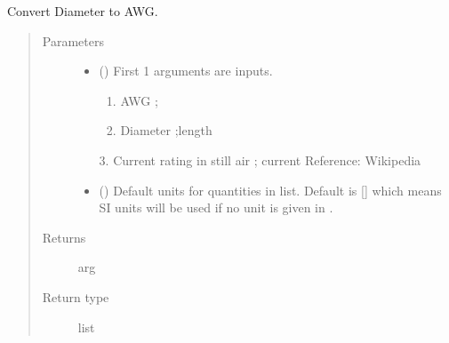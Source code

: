 \documentclass[letterpaper,10pt,english]{sphinxmanual}
\begin{document}

\begin{fulllineitems}
\label{\detokenize{components:components.Dia2AWG}}
Convert Diameter to AWG.
\begin{quote}\begin{description}
\item[{Parameters}] \leavevmode\begin{itemize}
\item {} 
 () \textendash{} 
First 1 arguments are inputs.
\begin{enumerate}
%
\item {} 
AWG ;

\item {} 
Diameter ;length

\end{enumerate}

3. Current rating in still air ; current
Reference:  Wikipedia


\item {} 
 (\sphinxstyleliteralemphasis{\sphinxupquote{, }}) \textendash{} Default units for quantities in  list. Default is {[}{]} which means SI units will be used if no unit is given in .

\end{itemize}

\item[{Returns}] \leavevmode
arg

\item[{Return type}] \leavevmode
list

\end{description}\end{quote}

\end{fulllineitems}

\end{document}

